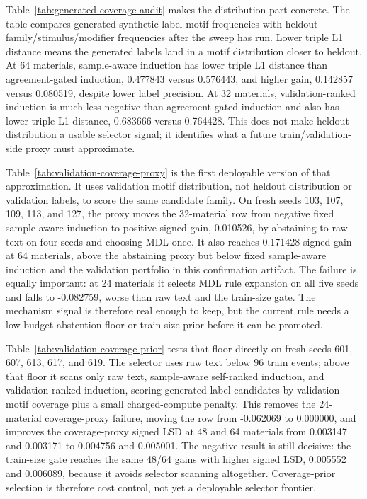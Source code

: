 \documentclass[11pt]{article}
\begin{document}
Table~\ref{tab:generated-coverage-audit} makes the distribution part concrete.
The table compares generated synthetic-label motif frequencies with heldout
family/stimulus/modifier frequencies after the sweep has run. Lower triple L1
distance means the generated labels land in a motif distribution closer to
heldout. At 64 materials, sample-aware induction has lower triple L1 distance
than agreement-gated induction, 0.477843 versus 0.576443, and higher gain,
0.142857 versus 0.080519, despite lower label precision. At 32 materials,
validation-ranked induction is much less negative than agreement-gated
induction and also has lower triple L1 distance, 0.683666 versus 0.764428.
This does not make heldout distribution a usable selector signal; it identifies
what a future train/validation-side proxy must approximate.

Table~\ref{tab:validation-coverage-proxy} is the first deployable version of
that approximation. It uses validation motif distribution, not heldout
distribution or validation labels, to score the same candidate family. On fresh
seeds 103, 107, 109, 113, and 127, the proxy moves the 32-material row from
negative fixed sample-aware induction to positive signed gain, 0.010526, by
abstaining to raw text on four seeds and choosing MDL once. It also reaches
0.171428 signed gain at 64 materials, above the abstaining proxy but below
fixed sample-aware induction and the validation portfolio in this confirmation
artifact. The failure is equally important: at 24 materials it
selects MDL rule expansion on all five seeds and falls to -0.082759, worse than
raw text and the train-size gate. The mechanism signal is therefore real enough
to keep, but the current rule needs a low-budget abstention floor or train-size
prior before it can be promoted.

Table~\ref{tab:validation-coverage-prior} tests that floor directly on fresh
seeds 601, 607, 613, 617, and 619. The selector uses raw text below 96 train
events; above that floor it scans only raw text, sample-aware self-ranked
induction, and validation-ranked induction, scoring generated-label candidates
by validation-motif coverage plus a small charged-compute penalty. This removes
the 24-material coverage-proxy failure, moving the row from -0.062069 to
0.000000, and improves the coverage-proxy signed LSD at 48 and 64 materials
from 0.003147 and 0.003171 to 0.004756 and 0.005001. The negative result is
still decisive: the train-size gate reaches the same 48/64 gains with higher
signed LSD, 0.005552 and 0.006089, because it avoids selector scanning
altogether. Coverage-prior selection is therefore cost control, not yet a
deployable selector frontier.
\end{document}
